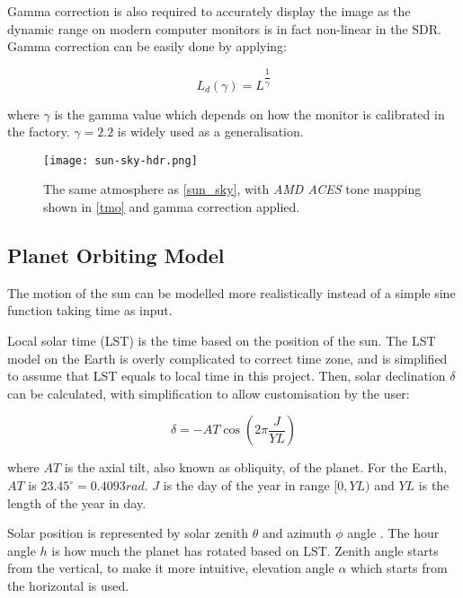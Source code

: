 \documentclass[oneside, a4paper]{report}
\begin{document}
    Gamma correction is also required to accurately display the image as the dynamic range on modern computer monitors is in fact non-linear in the SDR. Gamma correction can be easily done by applying:

    \begin{equation}
        L_{d}(\gamma) = L^{\dfrac{1}{\gamma}}
    \end{equation}

    where $\gamma$ is the gamma value which depends on how the monitor is calibrated in the factory. \(\gamma = 2.2\) is widely used as a generalisation.

    \begin{figure}[H]
        \texttt{[image: sun-sky-hdr.png]}
        \caption{The same atmosphere as \ref{sun_sky}, with \textit{AMD ACES} tone mapping shown in \ref{tmo} and gamma correction applied.}
    \end{figure}

    \subsection{Planet Orbiting Model}

    The motion of the sun can be modelled more realistically instead of a simple sine function taking time as input.

    Local solar time (LST) is the time based on the position of the sun. The LST model on the Earth is overly complicated \cite{daylight_model} to correct time zone, and is simplified to assume that LST equals to local time in this project. Then, solar declination $\delta$ can be calculated, with simplification to allow customisation by the user:

    \begin{equation}
        \delta = -AT\cos{\left( 2\pi\dfrac{J}{YL} \right)}
    \end{equation}

    where $AT$ is the axial tilt, also known as obliquity, of the planet. For the Earth, $AT$ is \(23.45^{\circ} = 0.4093 rad\). $J$ is the day of the year in range \([0, YL)\) and $YL$ is the length of the year in day.

    Solar position is represented by solar zenith \(\theta\) and azimuth \(\phi\) angle \cite{daylight_model}. The hour angle \(h\) is how much the planet has rotated based on LST. Zenith angle starts from the vertical, to make it more intuitive, elevation angle \(\alpha\) which starts from the horizontal is used.
\end{document}
